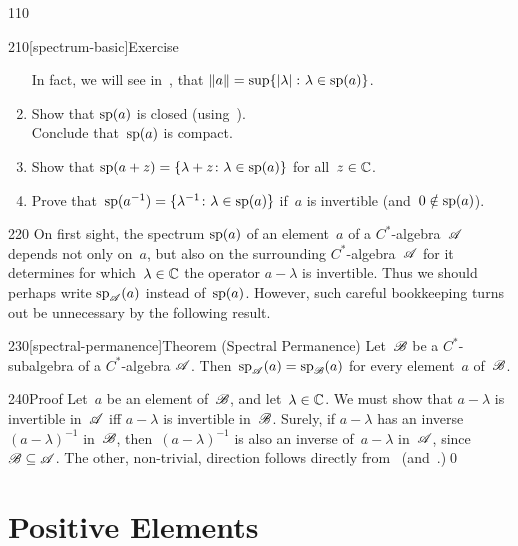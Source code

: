 \begin{parsec}{110}
\begin{point}{210}[spectrum-basic]{Exercise}
\begin{enumerate}
In fact, we will see in~,
that $\|a\|=\sup\{\left|\lambda\right|\colon \lambda\in \mathrm{sp}(a)\}$.
\item
Show that $\mathrm{sp}(a)$ is closed (using~).\\
Conclude that~$\mathrm{sp}(a)$ is compact.
\item
Show that $\mathrm{sp}(a+z)=\{\lambda+z\colon \lambda\in\mathrm{sp}(a)\}$
for all~$z\in \mathbb{C}$.
\item
Prove that~$\mathrm{sp}(a^{-1})=\{\lambda^{-1}\colon \lambda\in \mathrm{sp}(a)\}$
if~$a$ is invertible (and~$0\notin \mathrm{sp}(a)$).
\end{enumerate}
\end{point}
\begin{point}{220}%
On first sight,
the spectrum $\mathrm{sp}(a)$
of an element~$a$ of a $C^*$-algebra~$\mathscr{A}$ 
depends not only on~$a$,
but also on the surrounding $C^*$-algebra~$\mathscr{A}$ for it determines
for which~$\lambda\in\mathbb{C}$ the operator $a-\lambda$ is invertible.
Thus we should perhaps write $\mathrm{sp}_{\mathscr{A}}(a)$ instead
of~$\mathrm{sp}(a)$.
However, such careful bookkeeping turns out 
be unnecessary
by the following result.
\end{point}
\begin{point}{230}[spectral-permanence]{Theorem (Spectral Permanence)}%
%
Let~$\mathscr{B}$ be a $C^*$-subalgebra of a $C^*$-algebra $\mathscr{A}$.
Then~$\mathrm{sp}_{\mathscr{A}}(a)=\mathrm{sp}_{\mathscr{B}}(a)$
for every element~$a$ of~$\mathscr{B}$.
\begin{point}{240}{Proof}%
Let~$a$ be an element of~$\mathscr{B}$,
and let~$\lambda\in \mathbb{C}$.
We must show that $a-\lambda$ is invertible in~$\mathscr{A}$
iff $a-\lambda$ is invertible in~$\mathscr{B}$.
Surely,
if $a-\lambda$ has an inverse $(a-\lambda)^{-1}$ in~$\mathscr{B}$,
then~$(a-\lambda)^{-1}$ is also an inverse of~$a-\lambda$ in~$\mathscr{A}$,
since~$\mathscr{B}\subseteq \mathscr{A}$.
The other, non-trivial, direction follows
    directly from~ 
    (and~.)\qed%
\end{point}
\end{point}
\end{parsec}
\section{Positive Elements}
